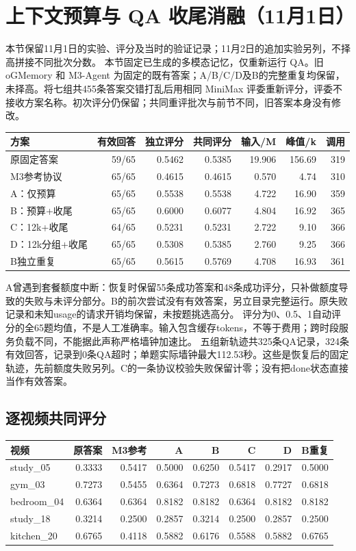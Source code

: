 \section{上下文预算与 QA 收尾消融（11月1日）}
\label{sec:context-optimization}
本节保留11月1日的实验、评分及当时的验证记录；11月2日的追加实验另列，不择高拼接不同批次分数。
本节固定已生成的多模态记忆，仅重新运行 QA。旧 oGMemory 和 M3-Agent 为固定的既有答案；A/B/C/D及B的完整重复均保留，未择高。将七组共455条答案交错打乱后用相同 MiniMax 评委重新评分，评委不接收方案名称。初次评分仍保留；共同重评批次与前节不同，旧答案本身没有修改。
\begin{center}\small
\begin{tabular}{lrrrrrr}\toprule
方案 & 有效回答 & 独立评分 & 共同评分 & 输入/M & 峰值/k & 调用\\\midrule
原固定答案 & 59/65 & 0.5462 & 0.5385 & 19.906 & 156.69 & 319\\
M3参考协议 & 65/65 & 0.4615 & 0.4615 & 0.570 & 4.74 & 310\\
A：仅预算 & 65/65 & 0.5538 & 0.5538 & 4.722 & 16.90 & 359\\
B：预算+收尾 & 65/65 & 0.6000 & 0.6077 & 4.804 & 16.92 & 365\\
C：12k+收尾 & 64/65 & 0.5231 & 0.5231 & 2.722 & 9.10 & 366\\
D：12k分组+收尾 & 65/65 & 0.5308 & 0.5385 & 2.760 & 9.25 & 366\\
B独立重复 & 65/65 & 0.5615 & 0.5769 & 4.708 & 16.93 & 361\\
\bottomrule\end{tabular}\end{center}
A曾遇到套餐额度中断：恢复时保留55条成功答案和48条成功评分，只补做额度导致的失败与未评分部分。B的前次尝试没有有效答案，另立目录完整运行。原失败记录和未知usage的请求开销均保留，未按题挑选高分。
评分为0、0.5、1自动评分的全65题均值，不是人工准确率。输入包含缓存tokens，不等于费用；跨时段服务负载不同，不能据此声称严格墙钟加速比。
五组新轨迹共325条QA记录，324条有效回答，记录到0条QA超时；单题实际墙钟最大112.53秒。这些是恢复后的固定轨迹，先前额度失败另列。C的一条协议校验失败保留计零；没有把done状态直接当作有效答案。
\subsection{逐视频共同评分}
\begin{center}\small\begin{tabular}{lrrrrrrr}\toprule
视频 & 原答案 & M3参考 & A & B & C & D & B重复\\\midrule
study\_05 & 0.3333 & 0.5417 & 0.5000 & 0.6250 & 0.5417 & 0.2917 & 0.5000\\
gym\_03 & 0.7273 & 0.5455 & 0.6364 & 0.7273 & 0.6818 & 0.7727 & 0.6818\\
bedroom\_04 & 0.6364 & 0.6364 & 0.8182 & 0.8182 & 0.6364 & 0.8182 & 0.8182\\
study\_18 & 0.3214 & 0.2500 & 0.2857 & 0.3214 & 0.2500 & 0.2857 & 0.2500\\
kitchen\_20 & 0.6765 & 0.4118 & 0.5882 & 0.6176 & 0.5588 & 0.5882 & 0.6765\\
\bottomrule\end{tabular}\end{center}
